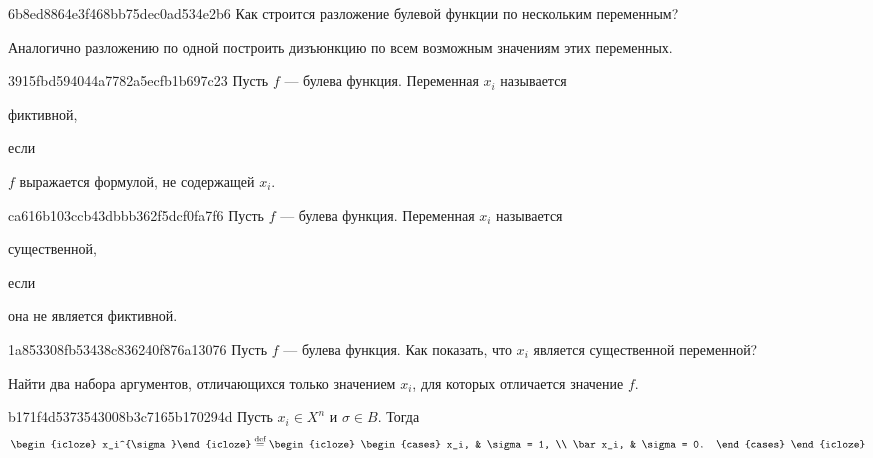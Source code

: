 \begin{note}{6b8ed8864e3f468bb75dec0ad534e2b6}
    Как строится разложение булевой функции по нескольким переменным?

    \begin{cloze}{1}
        Аналогично разложению по одной построить дизъюнкцию по всем возможным значениям этих переменных.
    \end{cloze}
\end{note}

\begin{note}{3915fbd594044a7782a5ecfb1b697c23}
    Пусть \({ f }\) --- булева функция.
    Переменная \({ x_i }\) называется \begin{icloze}{2}фиктивной,\end{icloze} если \begin{icloze}{1}\({ f }\) выражается формулой, не содержащей \({ x_i }\).\end{icloze}
\end{note}

\begin{note}{ca616b103ccb43dbbb362f5dcf0fa7f6}
    Пусть \({ f }\) --- булева функция.
    Переменная \({ x_i }\) называется \begin{icloze}{2}существенной,\end{icloze} если \begin{icloze}{1}она не является фиктивной.\end{icloze}
\end{note}

\begin{note}{1a853308fb53438c836240f876a13076}
    Пусть \({ f }\) --- булева функция.
    Как показать, что \({ x_i }\) является существенной переменной?

    \begin{cloze}{1}
        Найти два набора аргументов, отличающихся только значением \({ x_i }\), для которых отличается значение \({ f }\).
    \end{cloze}
\end{note}

\begin{note}{b171f4d5373543008b3c7165b170294d}
    Пусть \({ x_i \in X^{n} }\) и \({ \sigma \in B }\).
    Тогда
    \[
        \begin{icloze}{2}x_i^{\sigma}\end{icloze} \overset{\text{def}}=
        \begin{icloze}{1}
            \begin{cases}
                x_i, & \sigma = 1, \\
                \bar x_i, & \sigma = 0.
            \end{cases}
        \end{icloze}
    \]
\end{note}

